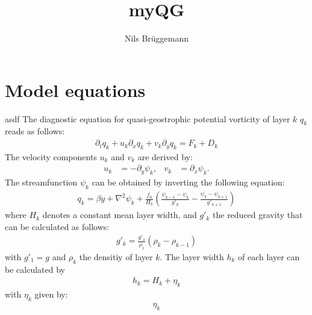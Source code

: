 \documentclass[a4paper,10pt]{article}
\title{myQG}
\author{Nils Br\"uggemann}
\newcommand{\px}{\partial_x}
\newcommand{\py}{\partial_y}
\begin{document}
\maketitle

\section{Model equations}
asdf 
The diagnostic equation for quasi-geostrophic potential vorticity of layer $k$ $q_k$ reads as follows:
\begin{align}
 \partial_t q_k + u_k \partial_x q_k + v_k \partial_y q_k = F_k + D_k 
\end{align}
The velocity components $u_k$ and $v_k$ are derived by:
\begin{align}
 u_k &= - \py \psi_k,
&
 v_k &=   \px \psi_k.
\end{align}
The streamfunction $\psi_k$ can be obtained by inverting the following equation:
\begin{align}
 q_k = \beta y + \nabla^2 \psi_k + \frac{f_0}{H_k} \left( \frac{\psi_{k-1} - \psi_k}{g'_k} - \frac{\psi_k-\psi_{k+1}}{g'_{k+1}} \right)
\end{align}
where $H_k$ denotes a constant mean layer width, and $g'_{k}$ the reduced gravity that can be calculated as follows:
\begin{align}
 g'_k = \frac{g'_1}{\rho_1} ( \rho_k - \rho_{k-1} )
\end{align}
with $g'_1 = g$ and $\rho_k$ the densitiy of layer $k$.
The layer width $h_k$ of each layer can be calculated by
\begin{align}
 h_k = H_k + \eta_k
\end{align}
with $\eta_k$ given by:
\begin{align}
 \eta_k
\end{align}
\end{document}

